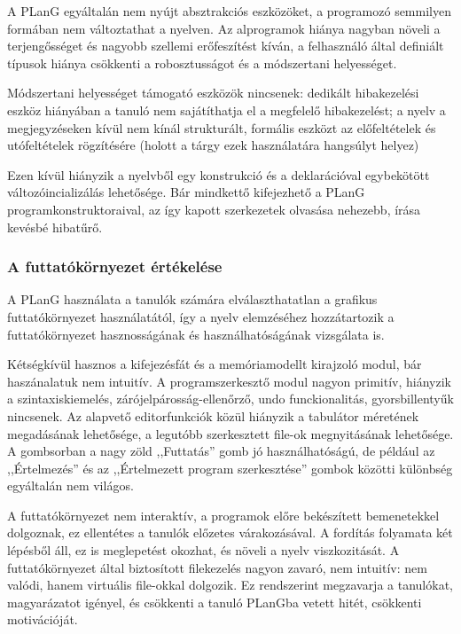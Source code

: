 A PLanG egyáltalán nem nyújt absztrakciós eszközöket, a programozó semmilyen formában nem változtathat a nyelven.
Az alprogramok hiánya nagyban növeli a terjengősséget és nagyobb szellemi erőfeszítést kíván, a felhasználó által definiált típusok hiánya csökkenti a robosztusságot és a módszertani helyességet.

Módszertani helyességet támogató eszközök nincsenek: dedikált hibakezelési eszköz hiányában a tanuló nem sajátíthatja el a megfelelő hibakezelést; a nyelv a megjegyzéseken kívül nem kínál strukturált, formális eszközt az előfeltételek és utófeltételek rögzítésére (holott a tárgy ezek használatára hangsúlyt helyez)

Ezen kívül hiányzik a nyelvből egy  konstrukció és a deklarációval egybekötött változóincializálás lehetősége. Bár mindkettő kifejezhető a PLanG programkonstruktoraival, az így kapott szerkezetek olvasása nehezebb, írása kevésbé hibatűrő.


\subsubsection{A futtatókörnyezet értékelése}
A PLanG használata a tanulók számára elválaszthatatlan a grafikus futtatókörnyezet használatától, így a nyelv elemzéséhez hozzátartozik a futtatókörnyezet hasznosságának és használhatóságának vizsgálata is.

Kétségkívül hasznos a kifejezésfát és a memóriamodellt kirajzoló modul, bár haszánalatuk nem intuitív.
A programszerkesztő modul nagyon primitív, hiányzik a szintaxiskiemelés, zárójelpárosság-ellenőrző, undo funckionalitás, gyorsbillentyűk nincsenek.
Az alapvető editorfunkciók közül hiányzik a tabulátor méretének megadásának lehetősége, a legutóbb szerkesztett file-ok megnyitásának lehetősége.
A gombsorban a nagy zöld ,,Futtatás'' gomb jó használhatóságú, de például az ,,Értelmezés'' és az ,,Értelmezett program szerkesztése'' gombok közötti különbség egyáltalán nem világos.

A futtatókörnyezet nem interaktív, a programok előre bekészített bemenetekkel dolgoznak, ez ellentétes a tanulók előzetes várakozásával.
A fordítás folyamata két lépésből áll, ez is meglepetést okozhat, és növeli a nyelv viszkozitását.
A futtatókörnyezet által biztosított filekezelés nagyon zavaró, nem intuitív: nem valódi, hanem virtuális file-okkal dolgozik.
Ez rendszerint megzavarja a tanulókat, magyarázatot igényel, és csökkenti a tanuló PLanGba vetett hitét, csökkenti motivációját.

